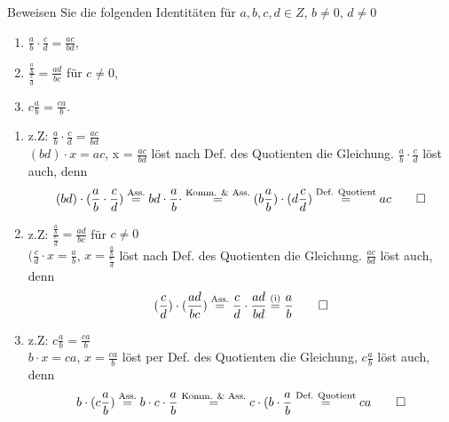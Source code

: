\begin{aufg}[6 Punkte]
Beweisen Sie die folgenden Identit\"aten f\"ur $a,b,c,d \in Z$, $b\neq 0$, $d\neq 0$ 
\begin{enumerate}[label=$\mathrm{(\roman*)}$, ref=$\mathrm{\roman*}$]
\item $\frac{a}{b} \cdot \frac{c}{d} = \frac{ac}{bd}$, 
\item $\frac{\frac{a}{b}}{\frac{c}{d}} = \frac{ad}{bc}$ f\"ur $c\not=0$,
\item $c \frac{a}{b} = \frac{ca}{b}$.
\end{enumerate}
\end{aufg}

\bigskip

\begin{comment}
\newcommand\Asseq{\stackrel{\mathclap{\normalfont\fontsize{4}\mbox{Ass.}}}{=}}
\newcommand\KommAsseq{\stackrel{\mathclap{\normalfont\fontsize{4}\mbox{Komm. & Ass.}}}{=}}
\newcommand\Defeq{\stackrel{\mathclap{\normalfont\fontsize{4}\mbox{Def. Quotient}}}{=}}
\newcommand\ieq{\stackrel{\mathclap{\normalfont\fontsize{4}\mbox{(i)}}}{=}}
\end{comment}


\newcommand\Asseq{\stackrel{\text{Ass.}}{=}}
\newcommand\KommAsseq{\stackrel{\text{Komm. \& Ass.}}{=}}
\newcommand\Defeq{\stackrel{\text{Def. Quotient}}{=}}
\newcommand\ieq{\stackrel{\text{(i)}}{=}}

\begin{lsg}
\begin{enumerate}[label=$\mathrm{(\roman*)}$, ref=$\mathrm{\roman*}$]
\item z.Z: $\frac{a}{b} \cdot \frac{c}{d} = \frac{ac}{bd}$\\
$(bd) \cdot x = ac$, x = $\frac{ac}{bd}$ l\"ost nach Def. des Quotienten die Gleichung.
$\frac{a}{b} \cdot \frac{c}{d}$ l\"ost auch, denn 
\[
(bd) \cdot (\frac{a}{b} \cdot \frac{c}{d}) \Asseq 
bd \cdot \frac{a}{b} \cdot \KommAsseq (b \frac{a}{b}) \cdot (d\frac{c}{d}) \Defeq ac \qed
\]
\item z.Z: $\frac{\frac{a}{b}}{\frac{c}{d}} = \frac{ad}{bc}$ f\"ur $c\not=0$\\
$(\frac{c}{d} \cdot x = \frac{a}{b}$, $x = \frac{\frac{a}{b}}{\frac{c}{d}}$ l\"ost nach Def. des Quotienten die Gleichung. $\frac{ac}{bd}$ l\"ost auch, denn
\[
(\frac{c}{d}) \cdot (\frac{ad}{bc}) \Asseq 
\frac{c}{d} \cdot \frac{ad}{bd} \ieq \frac{a}{b} \qed
\]
\item z.Z: $c\frac{a}{b} = \frac{ca}{b}$\\
$b \cdot x = ca$, $x = \frac{ca}{b}$ l\"ost per Def. des Quotienten die Gleichung, $c\frac{a}{b}$ l\"ost auch, denn
\[
b \cdot (c\frac{a}{b}) \Asseq 
b \cdot c \cdot \frac{a}{b} \KommAsseq c \cdot (b \cdot \frac{a}{b} \Defeq ca \qed
\]
\end{enumerate}
\end{lsg}

